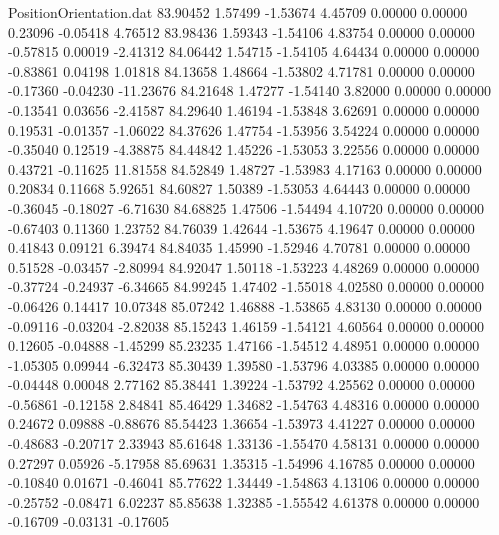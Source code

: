 \begin{filecontents}{PositionOrientation.dat}
  83.90452    1.57499   -1.53674     4.45709    0.00000    0.00000    0.23096   -0.05418    4.76512
  83.98436    1.59343   -1.54106     4.83754    0.00000    0.00000   -0.57815    0.00019   -2.41312
  84.06442    1.54715   -1.54105     4.64434    0.00000    0.00000   -0.83861    0.04198    1.01818
  84.13658    1.48664   -1.53802     4.71781    0.00000    0.00000   -0.17360   -0.04230  -11.23676
  84.21648    1.47277   -1.54140     3.82000    0.00000    0.00000   -0.13541    0.03656   -2.41587
  84.29640    1.46194   -1.53848     3.62691    0.00000    0.00000    0.19531   -0.01357   -1.06022
  84.37626    1.47754   -1.53956     3.54224    0.00000    0.00000   -0.35040    0.12519   -4.38875
  84.44842    1.45226   -1.53053     3.22556    0.00000    0.00000    0.43721   -0.11625   11.81558
  84.52849    1.48727   -1.53983     4.17163    0.00000    0.00000    0.20834    0.11668    5.92651
  84.60827    1.50389   -1.53053     4.64443    0.00000    0.00000   -0.36045   -0.18027   -6.71630
  84.68825    1.47506   -1.54494     4.10720    0.00000    0.00000   -0.67403    0.11360    1.23752
  84.76039    1.42644   -1.53675     4.19647    0.00000    0.00000    0.41843    0.09121    6.39474
  84.84035    1.45990   -1.52946     4.70781    0.00000    0.00000    0.51528   -0.03457   -2.80994
  84.92047    1.50118   -1.53223     4.48269    0.00000    0.00000   -0.37724   -0.24937   -6.34665
  84.99245    1.47402   -1.55018     4.02580    0.00000    0.00000   -0.06426    0.14417   10.07348
  85.07242    1.46888   -1.53865     4.83130    0.00000    0.00000   -0.09116   -0.03204   -2.82038
  85.15243    1.46159   -1.54121     4.60564    0.00000    0.00000    0.12605   -0.04888   -1.45299
  85.23235    1.47166   -1.54512     4.48951    0.00000    0.00000   -1.05305    0.09944   -6.32473
  85.30439    1.39580   -1.53796     4.03385    0.00000    0.00000   -0.04448    0.00048    2.77162
  85.38441    1.39224   -1.53792     4.25562    0.00000    0.00000   -0.56861   -0.12158    2.84841
  85.46429    1.34682   -1.54763     4.48316    0.00000    0.00000    0.24672    0.09888   -0.88676
  85.54423    1.36654   -1.53973     4.41227    0.00000    0.00000   -0.48683   -0.20717    2.33943
  85.61648    1.33136   -1.55470     4.58131    0.00000    0.00000    0.27297    0.05926   -5.17958
  85.69631    1.35315   -1.54996     4.16785    0.00000    0.00000   -0.10840    0.01671   -0.46041
  85.77622    1.34449   -1.54863     4.13106    0.00000    0.00000   -0.25752   -0.08471    6.02237
  85.85638    1.32385   -1.55542     4.61378    0.00000    0.00000   -0.16709   -0.03131   -0.17605

\end{filecontents}
